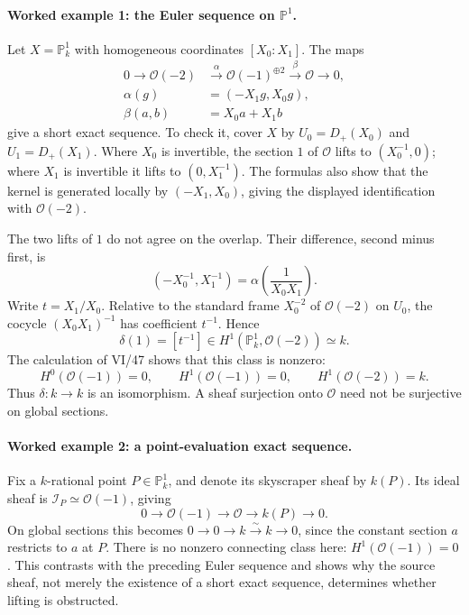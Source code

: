 \paragraph{Worked example 1: the Euler sequence on $\mathbb P^1$.}
Let $X=\mathbb P^1_k$ with homogeneous coordinates $[X_0:X_1]$.
The maps
\[
\begin{aligned}
0\longrightarrow\mathcal O(-2)
 &\xrightarrow{\ \alpha\ }\mathcal O(-1)^{\oplus2}
 \xrightarrow{\ \beta\ }\mathcal O\longrightarrow0,\\
\alpha(g)&=(-X_1g,X_0g),\\
\beta(a,b)&=X_0a+X_1b
\end{aligned}
\]
give a short exact sequence.  To check it, cover $X$ by
$U_0=D_+(X_0)$ and $U_1=D_+(X_1)$.  Where $X_0$ is invertible,
the section $1$ of $\mathcal O$ lifts to $(X_0^{-1},0)$;
where $X_1$ is invertible it lifts to $(0,X_1^{-1})$.
The formulas also show that the kernel is generated locally
by $(-X_1,X_0)$, giving the displayed identification with
$\mathcal O(-2)$.

The two lifts of $1$ do not agree on the overlap.  Their
difference, second minus first, is
\[
(-X_0^{-1},X_1^{-1})
 =\alpha\!\left(\frac{1}{X_0X_1}\right).
\]
Write $t=X_1/X_0$.  Relative to the standard frame
$X_0^{-2}$ of $\mathcal O(-2)$ on $U_0$, the cocycle
$(X_0X_1)^{-1}$ has coefficient $t^{-1}$.  Hence
\[
 \delta(1)=[t^{-1}]
 \in H^1(\mathbb P^1_k,\mathcal O(-2))\simeq k.
\]
The calculation of VI/47 shows that this class is nonzero:
\[
H^0(\mathcal O(-1))=0,\qquad
H^1(\mathcal O(-1))=0,\qquad
H^1(\mathcal O(-2))=k.
\]
Thus $\delta:k\to k$ is an isomorphism.  A sheaf surjection
onto $\mathcal O$ need not be surjective on global sections.

\paragraph{Worked example 2: a point-evaluation exact sequence.}
Fix a $k$-rational point $P\in\mathbb P^1_k$, and denote its
skyscraper sheaf by $k(P)$.  Its ideal sheaf is
$\mathcal I_P\simeq\mathcal O(-1)$, giving
\[
0\to\mathcal O(-1)\to\mathcal O\to k(P)\to0.
\]
On global sections this becomes
$0\to0\to k\xrightarrow{\sim}k\to0$, since the constant
section $a$ restricts to $a$ at $P$.  There is no nonzero
connecting class here: $H^1(\mathcal O(-1))=0$.
This contrasts with the preceding Euler sequence and shows
why the source sheaf, not merely the existence of a short
exact sequence, determines whether lifting is obstructed.


